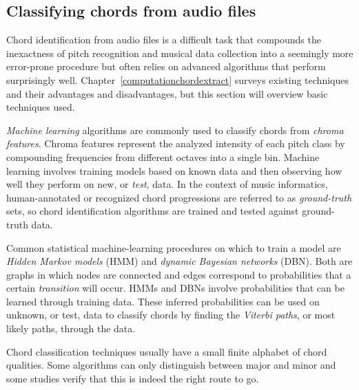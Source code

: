 \subsection{Classifying chords from audio files}

Chord identification from audio files is a difficult task that compounds the inexactness of pitch recognition and musical data collection into a seemingly more error-prone procedure but often relies on advanced algorithms that perform surprisingly well. Chapter~\ref{computationchordextract} surveys existing techniques and their advantages and disadvantages, but this section will overview basic techniques used.

\textit{Machine learning} algorithms are commonly used to classify chords from \textit{chroma features}. Chroma features represent the analyzed intensity of each pitch class by compounding frequencies from different octaves into a single bin. Machine learning involves training models based on known data and then observing how well they perform on new, or \textit{test}, data. In the context of music informatics, human-annotated or recognized chord progressions are referred to as \textit{ground-truth} sets\cite{BurgoyneEtAl_2011_AnExpeGrouSet}, so chord identification algorithms are trained and tested against ground-truth data.

Common statistical machine-learning procedures on which to train a model are \textit{Hidden Markov models} (HMM) and \textit{dynamic Bayesian networks} (DBN). Both are graphs in which nodes are connected and edges correspond to probabilities that a certain \textit{transition} will occur. HMMs and DBNs involve probabilities that can be learned through training data. These inferred probabilities can be used on unknown, or test, data to classify chords by finding the \textit{Viterbi paths}, or most likely paths, through the data.

Chord classification techniques usually have a small finite alphabet of chord qualities. Some algorithms can only distinguish between major and minor and some studies verify that this is indeed the right route to go.